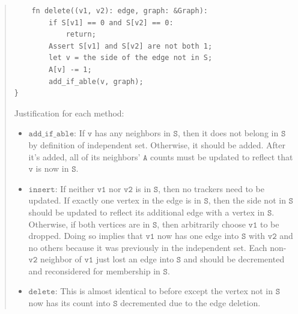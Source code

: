 \documentclass[11pt]{article}
\newcommand{\code}[1]{$\texttt{#1}$}
\begin{document}
\begin{enumerate}
\begin{enumerate}[resume]
\begin{quote}
\begin{verbatim}
    fn delete((v1, v2): edge, graph: &Graph):
        if S[v1] == 0 and S[v2] == 0:
            return;
        Assert S[v1] and S[v2] are not both 1;
        let v = the side of the edge not in S;
        A[v] -= 1;
        add_if_able(v, graph);
}
    \end{verbatim}

    Justification for each method: 
    \begin{itemize}
      \item \code{add\_if\_able}: If \code{v} has any neighbors in \code{S}, then it does not belong in \code{S} by definition of independent set. Otherwise, it should be added. After it's added, all of its neighbors' \code{A} counts must be updated to reflect that \code{v} is now in \code{S}.
      \item \code{insert}: If neither \code{v1} nor \code{v2} is in \code{S}, then no trackers need to be updated. If exactly one vertex in the edge is in \code{S}, then the side not in \code{S} should be updated to reflect its additional edge with a vertex in \code{S}. Otherwise, if both vertices are in \code{S}, then arbitrarily choose \code{v1} to be dropped. Doing so implies that \code{v1} now has one edge into \code{S} with \code{v2} and no others because it was previously in the independent set. Each non-\code{v2} neighbor of \code{v1} just lost an edge into \code{S} and should be decremented and reconsidered for membership in \code{S}. 
      \item \code{delete}: This is almost identical to before except the vertex not in \code{S} now has its count into \code{S} decremented due to the edge deletion.
    \end{itemize}
      

\end{quote}
\end{enumerate}
\end{enumerate}
\end{document}
